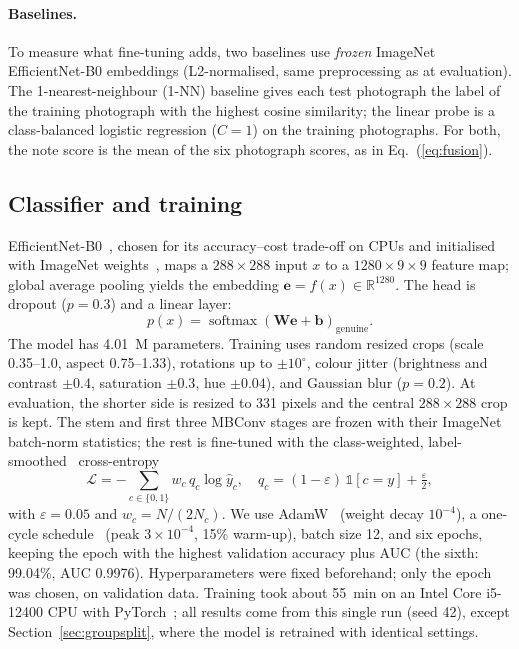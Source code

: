 \documentclass[pdflatex,sn-mathphys-num]{sn-jnl}
\begin{document}
\paragraph{Baselines.} To measure what fine-tuning adds, two baselines use \emph{frozen}
ImageNet EfficientNet-B0 embeddings (L2-normalised, same preprocessing as at
evaluation). The 1-nearest-neighbour (1-NN) baseline gives each test photograph the
label of the training photograph with the highest cosine similarity; the linear probe is
a class-balanced logistic regression ($C=1$) on the training photographs. For both, the
note score is the mean of the six photograph scores, as in Eq.~(\ref{eq:fusion}).

\subsection{Classifier and training}\label{sec:training}

EfficientNet-B0~\cite{tan2019efficientnet}, chosen for its accuracy--cost trade-off on
CPUs and initialised with ImageNet weights~\cite{deng2009imagenet}, maps a
$288\times288$ input $x$ to a $1280\times9\times9$ feature map; global average pooling
yields the embedding $\mathbf{e}=f(x)\in\mathbb{R}^{1280}$. The head is dropout
($p=0.3$) and a linear layer:
\begin{equation}
p(x) = \operatorname{softmax}\!\left(\mathbf{W}\mathbf{e}+\mathbf{b}\right)_{\text{genuine}} .
\label{eq:prob}
\end{equation}
The model has 4.01~M parameters. Training uses random resized crops (scale 0.35--1.0,
aspect 0.75--1.33), rotations up to $\pm10^\circ$, colour jitter (brightness and contrast
$\pm0.4$, saturation $\pm0.3$, hue $\pm0.04$), and Gaussian blur ($p=0.2$). At
evaluation, the shorter side is resized to 331 pixels and the central $288\times288$
crop is kept. The stem and first three MBConv stages are frozen with their ImageNet
batch-norm statistics; the rest is fine-tuned with the class-weighted,
label-smoothed~\cite{szegedy2016inception} cross-entropy
\begin{equation}
\mathcal{L} = -\sum_{c\in\{0,1\}} w_c\, q_c \log \hat{y}_c, \quad
q_c = (1-\varepsilon)\,\mathbb{1}[c=y] + \tfrac{\varepsilon}{2},
\label{eq:loss}
\end{equation}
with $\varepsilon=0.05$ and $w_c=N/(2N_c)$. We use AdamW~\cite{loshchilov2019adamw}
(weight decay $10^{-4}$), a one-cycle schedule~\cite{smith2019superconvergence} (peak
$3\times10^{-4}$, 15\% warm-up), batch size 12, and six epochs, keeping the epoch with
the highest validation accuracy plus AUC (the sixth: 99.04\%, AUC 0.9976).
Hyperparameters were fixed beforehand; only the epoch was chosen, on validation data. Training took about 55~min on an Intel Core i5-12400 CPU with
PyTorch~\cite{paszke2019pytorch}; all results come from this single run (seed 42),
except Section~\ref{sec:groupsplit}, where the model is retrained with identical settings.
\end{document}
